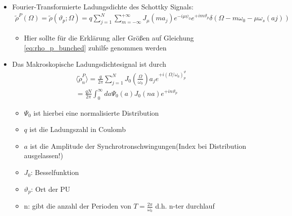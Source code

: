 \documentclass[12pt]{article}%
\renewcommand{\theta}{\vartheta}
\begin{document}
\begin{itemize}
	\item Fourier-Transformierte Ladungsdichte des Schottky Signals: 
	\begin{align}
		\label{eq: ft_rho_bunched}
		\tilde{\rho}^P(\Omega) =\tilde{\rho}(\theta_p;\Omega) = q \sum_{j=1}^{N}\sum_{m = - \infty}^{+\infty} J_\mu(ma_j)e^{-i\mu\psi_0}e^{+im\theta_p}\delta(\Omega-m\omega_0-\mu\omega_s(aj))
		\end{align}
	\begin{itemize}
		\item Hier sollte für die Erklärung aller Größen auf Gleichung \eqref{eq:rho_p_bunched} zuhilfe genommen werden
	\end{itemize}
\end{itemize}

\begin{itemize}
	\item Das Makroskopische Ladungsdichtesignal ist durch 
	\begin{align}
		\langle  \tilde{\rho}^P_n \rangle = \frac{q}{2 \pi} \sum_{j=1}^{N} J_0(\frac{\Omega}{\omega_0})a_je^{+i(\Omega/\omega_0)^\theta_p} \\
		= \frac{qN}{2\pi}\int_{0}^{\infty} da \Psi_0(a)J_0(na)e^{+in\theta_p}
	\end{align}
	\begin{itemize}
		\item $\Psi_0$ ist hierbei eine normalisierte Distribution
		\item $q$ ist die Ladungszahl in Coulomb
		\item$a$ ist die Amplitude der Synchrotronschwingungen(Index bei Distribution ausgelassen!)
		\item $J_0$: Besselfunktion
		\item $\theta_p$: Ort der PU 
		\item n: gibt die  anzahl der Perioden von $T=\frac{2\pi}{\omega_0}$ d.h. n-ter durchlauf
		
	\end{itemize}
\end{itemize}
\end{document}
